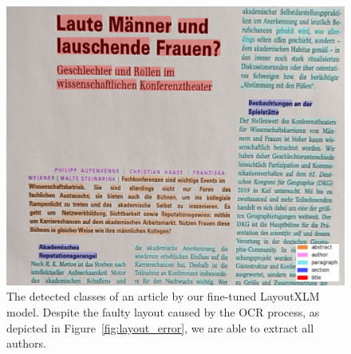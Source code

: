 \begin{figure}[!ht]
    \centering
    \includegraphics[width=0.85\linewidth]{images/layoutxlm.png}
    \caption{The detected classes of an article by our fine-tuned LayoutXLM model. Despite the faulty layout caused by the OCR process, as depicted in Figure~\ref{fig:layout_error}, we are able to extract all authors.}
    \label{fig:layoutxlm_result}
\end{figure}

